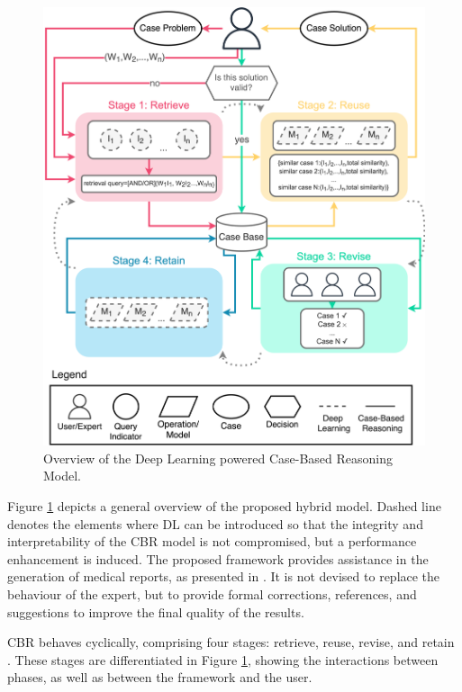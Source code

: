 \begin{figure}[t]
    \centering
    \includegraphics[width=.8\linewidth]{5_dlintegrationkbs/figures/Overview_CBR_DL.eps}
    \caption{Overview of the Deep Learning powered Case-Based Reasoning Model.}
    \label{fig:overview_CBR_DL}
\end{figure}

Figure \ref{fig:overview_CBR_DL} depicts a general overview of the proposed hybrid model. Dashed line denotes the elements where DL can be introduced so that the integrity and interpretability of the CBR model is not compromised, but a performance enhancement is induced. The proposed framework provides assistance in the generation of medical reports, as presented in \cite{DBLP:journals/ijimai/Amador-Dominguez21}. It is not devised to replace the behaviour of the expert, but to provide formal corrections, references, and suggestions to improve the final quality of the results. 

CBR behaves cyclically, comprising four stages: retrieve, reuse, revise, and retain \citep{overview_cbr}. These stages are differentiated in Figure \ref{fig:overview_CBR_DL}, showing the interactions between phases, as well as between the framework and the user. 

\color{purple}

